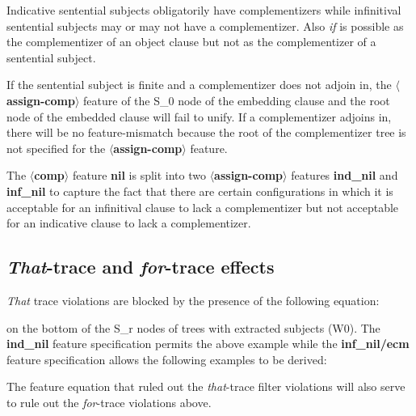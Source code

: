 
Indicative sentential subjects obligatorily have complementizers while
infinitival sentential subjects may or may not have a complementizer. 
Also {\em if} is possible as the complementizer of an object clause
but not as the complementizer of a sentential subject.


If the sentential subject is finite and a complementizer does
not adjoin in, the {\bf $\langle$assign-comp$\rangle$} feature of the 
S_{0} node of the embedding clause and the root node of the
embedded clause will fail to unify. If a complementizer adjoins in,
there will be no feature-mismatch because the root of the
complementizer tree is not specified for the {\bf $\langle$assign-comp$\rangle$} feature.

The {\bf $\langle$comp$\rangle$} feature {\bf nil} is split into two
{\bf $\langle$assign-comp$\rangle$} features {\bf ind\_nil} and
{\bf inf\_nil} to capture the fact that there are certain configurations in
which it is acceptable for an infinitival clause to lack a complementizer
but not acceptable for an indicative clause to lack a complementizer. 

\subsection{{\em That}-trace and {\em for}-trace effects}


{\em That} trace violations are blocked by the presence of the following
equation:


on the bottom of the S_{r} nodes of trees with extracted subjects (W0). 
The {\bf ind\_nil} feature specification permits the above example
while the {\bf inf\_nil/ecm} feature specification allows the
following examples to be derived:


The feature equation that ruled out the {\em that}-trace filter violations
will also serve to rule out the {\em for}-trace violations above.

